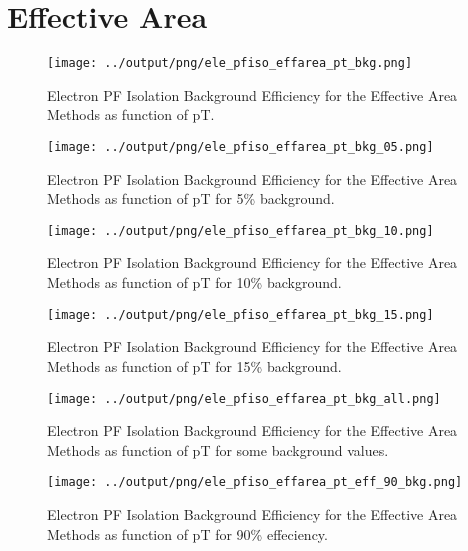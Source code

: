\documentclass[11pt]{book}
\begin{document}
\section{Effective Area}
\begin{figure}[htb]
\centering
\texttt{[image: ../output/png/ele\_pfiso\_effarea\_pt\_bkg.png]}
\caption{Electron PF Isolation Background Efficiency for the Effective Area Methods as function of pT.}
\label{fig:ele_pfiso_pt_bkg_effarea}
\end{figure}

\begin{figure}[htb]
\centering
\texttt{[image: ../output/png/ele\_pfiso\_effarea\_pt\_bkg\_05.png]}
\caption{Electron PF Isolation Background Efficiency for the Effective Area Methods as function of pT for 5\% background.}
\label{fig:ele_pfiso_pt_bkg_effarea_bkg_05}
\end{figure}

\begin{figure}[htb]
\centering
\texttt{[image: ../output/png/ele\_pfiso\_effarea\_pt\_bkg\_10.png]}
\caption{Electron PF Isolation Background Efficiency for the Effective Area Methods as function of pT for 10\% background.}
\label{fig:ele_pfiso_pt_bkg_effarea_bkg_10}
\end{figure}

\begin{figure}[htb]
\centering
\texttt{[image: ../output/png/ele\_pfiso\_effarea\_pt\_bkg\_15.png]}
\caption{Electron PF Isolation Background Efficiency for the Effective Area Methods as function of pT for 15\% background.}
\label{fig:ele_pfiso_pt_bkg_effarea_bkg_15}
\end{figure}

\begin{figure}[htb]
\centering
\texttt{[image: ../output/png/ele\_pfiso\_effarea\_pt\_bkg\_all.png]}
\caption{Electron PF Isolation Background Efficiency for the Effective Area Methods as function of pT for some background values.}
\label{fig:ele_pfiso_pt_bkg_effarea_bkg_all}
\end{figure}

\begin{figure}[htb]
\centering
\texttt{[image: ../output/png/ele\_pfiso\_effarea\_pt\_eff\_90\_bkg.png]}
\caption{Electron PF Isolation Background Efficiency for the Effective Area Methods as function of pT for 90\% effeciency.}
\label{fig:ele_pfiso_pt_eff_effarea_eff_90_bkg}
\end{figure}
\end{document}
